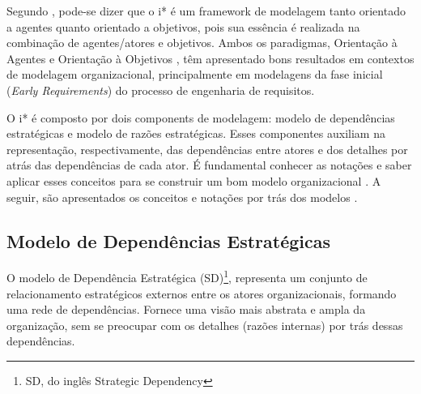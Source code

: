                 Segundo \cite{yu2011social}, pode-se dizer que o i* é um framework de modelagem tanto orientado a agentes quanto orientado a objetivos, pois sua essência é realizada na combinação de agentes/atores e objetivos.
                Ambos os paradigmas, Orientação à Agentes \cite{mao2005organizational} e Orientação à Objetivos \cite{van2004goal}, têm apresentado bons resultados em contextos de modelagem organizacional, principalmente em modelagens da fase inicial (\emph{Early Requirements}) do processo de engenharia de requisitos. %

                O i* é composto por dois components de modelagem: modelo de dependências estratégicas e modelo de razões estratégicas.
                Esses componentes auxiliam na representação, respectivamente, das dependências entre atores e dos detalhes por atrás das dependências de cada ator.
                É fundamental conhecer as notações e saber aplicar esses conceitos para se construir um bom modelo organizacional \cite{webster2005survey}.
                A seguir, são apresentados os conceitos e notações por trás dos modelos \cite{site2013iwiki}.

        \subsection{Modelo de Dependências Estratégicas}
                O modelo de Dependência Estratégica (SD)\footnote{SD, do inglês Strategic Dependency},
                representa um conjunto de relacionamento estratégicos externos entre os atores organizacionais, formando uma rede de dependências.
                Fornece uma visão mais abstrata e ampla da organização, sem se preocupar com os detalhes (razões internas) por trás dessas dependências.

